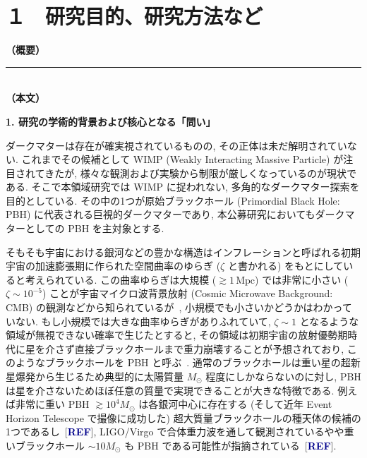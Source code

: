 \documentclass[11pt,a4paper,uplatex,dvipdfmx]{ujarticle} 		%
\newcommand{\研究課題名}{曲率ゆらぎの統計と原始ブラックホール量の精密対応}
\newcommand{\研究機関名}{名古屋大学}
\newcommand{\研究代表者氏名}{多田祐一郎}
\newcommand{\研究期間の最終元号年度}{4}  %
\newcommand{\Blue}[1]{\textcolor{darkblue}{\sffamily\gtfamily\bfseries #1}}
\begin{document}
\mgfamily\sffamily


\section{１　研究目的、研究方法など}

\noindent
\textbf{（概要）}\\
	
	\vspace*{10zw}	%

\noindent
\rule{\linewidth}{1pt}\\
\noindent
\textbf{（本文）}

\begin{mdframed}[roundcorner=0.5zw,
	innertopmargin=0.8zw,innerbottommargin=0.8zw,
	linecolor=black!50,linewidth=0.2zw,
	backgroundcolor=black!10]
	{\bfseries\gtfamily\sffamily\large 1. 研究の学術的背景および核心となる「問い」}
\end{mdframed}

\noindent
ダークマターは存在が確実視されているものの, その正体は未だ解明されていない.
これまでその候補として WIMP (Weakly Interacting Massive Particle) が注目されてきたが, 様々な観測および実験から制限が厳しくなっているのが現状である.
そこで本領域研究では WIMP に捉われない, 多角的なダークマター探索を目的としている.
その中の1つが原始ブラックホール (Primordial Black Hole: PBH) に代表される巨視的ダークマターであり,
本公募研究においてもダークマターとしての PBH を主対象とする.

そもそも宇宙における銀河などの豊かな構造はインフレーションと呼ばれる初期宇宙の加速膨張期に作られた空間曲率のゆらぎ ($\zeta$ と書かれる) をもとにしていると考えられている.
この曲率ゆらぎは大規模 ($\gtrsim1\,\mathrm{Mpc}$) では非常に小さい ($\zeta\sim10^{-5}$) ことが宇宙マイクロ波背景放射 (Cosmic Microwave Background: CMB) の観測などから知られているが~\cite{Aghanim:2018eyx},
小規模でも小さいかどうかはわかっていない.
もし小規模では大きな曲率ゆらぎがありふれていて, $\zeta\sim1$ となるような領域が無視できない確率で生じたとすると, その領域は初期宇宙の放射優勢期時代に星を介さず直接ブラックホールまで重力崩壊することが予想されており,
このようなブラックホールを PBH と呼ぶ~\cite{Carr:1974nx}.
通常のブラックホールは重い星の超新星爆発から生じるため典型的に太陽質量 $M_\odot$ 程度にしかならないのに対し,
PBH は星を介さないためほぼ任意の質量で実現できることが大きな特徴である.
例えば非常に重い PBH $\gtrsim10^4M_\odot$ は各銀河中心に存在する (そして近年 Event Horizon Telescope で撮像に成功した) 超大質量ブラックホールの種天体の候補の1つであるし~[\Blue{REF}],
LIGO/Virgo で合体重力波を通して観測されているやや重いブラックホール $\sim10M_\odot$ も PBH である可能性が指摘されている~[\Blue{REF}].
\end{document}
